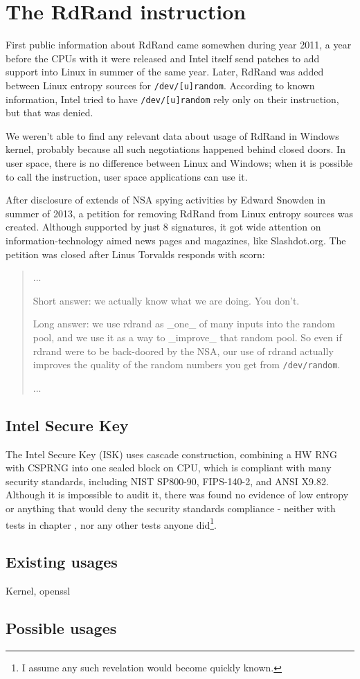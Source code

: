 \chapter{The RdRand instruction}  \label{chap:rdrand-instruction}
First public information about RdRand came somewhen during year 2011\cite{IntelRdRandFindAbout}, a year before the CPUs with it were released and Intel itself send patches to add support into Linux in summer of the same year\cite{KernelRdRand}. Later, RdRand was added between Linux entropy sources for {\tt /dev/[u]random}.%
According to known information\cite{TheodoreTsoNSA}, Intel tried to have {\tt /dev/[u]random} rely only on their instruction, but that was denied. 

We weren't able to find any relevant data about usage of RdRand in Windows kernel, probably because all such negotiations happened behind closed doors. In user space, there is no difference between Linux and Windows; when it is possible to call the instruction, user space applications can use it. 

After disclosure of extends of NSA spying activities by Edward Snowden in summer of 2013\cite{GuardianNSA}\cite{DailymailNSA}, a petition for removing RdRand from Linux entropy sources was created\cite{PetitionRdRand}. Although supported by just 8 signatures, it got wide attention on information-technology aimed news pages and magazines, like Slashdot.org\cite{PetitionRdRandSlashdot}. The petition was closed after Linus Torvalds responds with scorn:

\begin{quote} ...

Short answer: we actually know what we are doing. You don't.

Long answer: we use rdrand as \_one\_ of many inputs into the random pool, and we use it as a way to \_improve\_ that random pool. So even if rdrand were to be back-doored by the NSA, our use of rdrand actually improves the quality of the random numbers you get from {\tt /dev/random}.

...
\end{quote}


\section{Intel Secure Key} \label{sec:intel-secure-key}
The Intel Secure Key (ISK) uses cascade construction, combining a HW RNG with CSPRNG into one sealed block on CPU, which is compliant with many security standards, including NIST SP800-90, FIPS-140-2, and ANSI X9.82\cite{IntelDRNGGuide}. Although it is impossible to audit it, there was found no evidence of low entropy or anything that would deny the security standards compliance - neither with tests in chapter , nor any other tests anyone did\footnote{I assume any such revelation would become quickly known.}.

\section{Existing usages} 
Kernel, openssl
\section{Possible usages}


